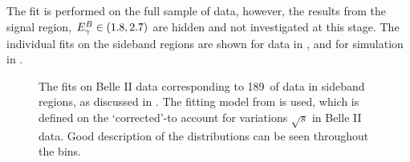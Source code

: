 The fit is performed on the full sample of data, however, the results from the signal region, ${E^B_{\gamma}}\in(1.8,2.7)$ are hidden and not investigated at this stage.
The individual \Mbc fits on the \EB sideband regions are shown for data in , and for simulation in .
\begin{figure}[htbp!]
    \centering
    \caption{\label{fig:sideband_data_fit}    
    The \Mbc fits on Belle II data corresponding to 189~\invfb of data in \EB sideband regions,
    as discussed in .
    The fitting model from  is used,
    which is defined on the `corrected'-\Mbc to account for variations $\sqrt{s}$ in Belle II data.
    Good description of the \Mbc distributions can be seen throughout the \EB bins.
    }
\end{figure}
